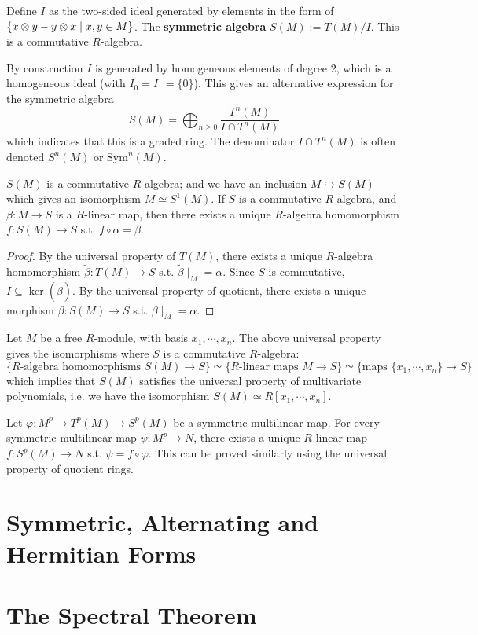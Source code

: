\documentclass{article}
\begin{document}
\begin{definition}
    Define $I$ as the two-sided ideal generated by elements in the form of $\{x \otimes y - y \otimes x \mid x, y \in M\}$. The \textbf{symmetric algebra} $S(M) := T(M)/I$. This is a commutative $R$-algebra.
\end{definition}

\begin{remark}
    By construction $I$ is generated by homogeneous elements of degree 2, which is a homogeneous ideal (with $I_0 = I_1 = \{0\}$). This gives an alternative expression for the symmetric algebra 
    \[
        S(M) = \bigoplus_{n \geq 0} \frac{T^n(M)}{I \cap T^n(M)}
    \]
    which indicates that this is a graded ring. The denominator $I \cap T^n(M)$ is often denoted $S^n(M)$ or $\text{Sym}^n(M)$.
\end{remark}

\begin{proposition}
    $S(M)$ is a commutative $R$-algebra; and we have an inclusion $M \hookrightarrow S(M)$ which gives an isomorphism $M \simeq S^1(M)$. If $S$ is a commutative $R$-algebra, and $\beta: M \to S$ is a $R$-linear map, then there exists a unique $R$-algebra homomorphism $f: S(M) \to S$ s.t. $f \circ \alpha = \beta$.   
\end{proposition}

\begin{proof}
    By the universal property of $T(M)$, there exists a unique $R$-algebra homomorphism $\tilde{\beta}: T(M) \to S$ s.t. $\tilde{\beta} \mid_M = \alpha$. Since $S$ is commutative, $I \subseteq \ker (\tilde{\beta})$. By the universal property of quotient, there exists a unique morphism $\beta: S(M) \to S$ s.t. $\beta\mid_M = \alpha$.
\end{proof}

\begin{example}
    Let $M$ be a free $R$-module, with basis $x_1, \cdots, x_n$. The above universal property gives the isomorphisms where $S$ is a commutative $R$-algebra:
    \[
        \{ \text{$R$-algebra homomorphisms } S(M) \to S\} \simeq \{\text{$R$-linear maps $M \to S$}\} \simeq \{\text{maps } \{ x_1, \cdots, x_n \} \to S\}
    \]
    which implies that $S(M)$ satisfies the universal property of multivariate polynomials, i.e. we have the isomorphism $S(M) \simeq R[x_1, \cdots, x_n]$.
\end{example}

\begin{example}
    Let $\varphi: M^p \to T^p(M) \to S^p(M)$ be a symmetric multilinear map. For every symmetric multilinear map $\psi: M^p \to N$, there exists a unique $R$-linear map $f: S^p(M) \to N$ s.t. $\psi = f \circ \varphi$. This can be proved similarly using the universal property of quotient rings.
\end{example}

\section{Symmetric, Alternating and Hermitian Forms}

\section{The Spectral Theorem}
\end{document}
